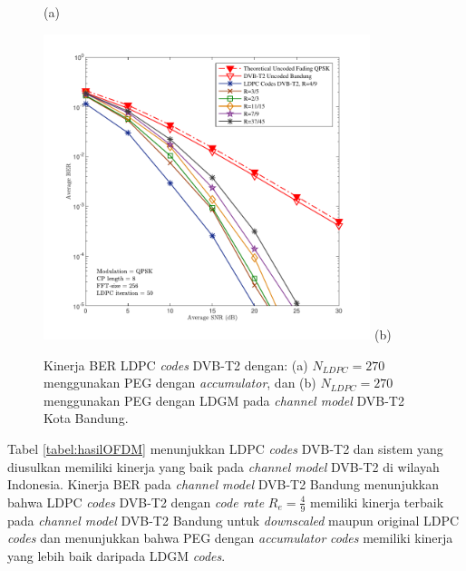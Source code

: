\begin{figure}[H]
\begin{minipage}{1\linewidth}
 		\center  (a)
 	\end{minipage}
 	\hfill
 	\begin{minipage}{1\linewidth}
 		\hspace{0.75 cm}
 		\includegraphics[width=0.85\textwidth]{hasilOFDMpegfixLDGM2.pdf}
 		\vspace{-1cm}
 		\center (b)
 	\end{minipage}
 	\caption {Kinerja BER LDPC \textit{codes} DVB-T2 dengan: (a) $N_{LDPC}=270$ menggunakan PEG dengan \textit{accumulator}, dan (b) $N_{LDPC}=270$ menggunakan PEG dengan LDGM pada \textit{channel model} DVB-T2 Kota Bandung.}
 	\label{gambar:peg}
 \end{figure}
 
  Tabel \ref{tabel:hasilOFDM} menunjukkan LDPC \textit{codes} DVB-T2 dan sistem yang diusulkan memiliki kinerja  yang baik pada \textit{channel model} DVB-T2 di wilayah Indonesia. Kinerja BER pada \textit{channel model} DVB-T2 Bandung menunjukkan bahwa LDPC \textit{codes} DVB-T2 dengan \textit{code rate} $R_e=\frac{4}{9}$ memiliki kinerja terbaik pada \textit{channel model} DVB-T2 Bandung untuk \textit{downscaled} maupun original LDPC \textit{codes} dan menunjukkan bahwa PEG dengan \textit{accumulator} \textit{codes} memiliki kinerja yang lebih baik daripada LDGM \textit{codes}.
  

